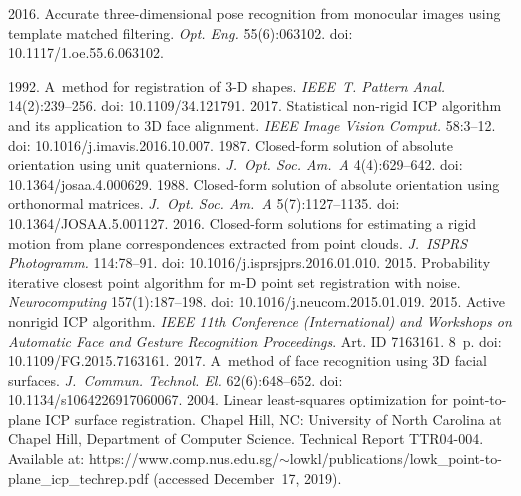 \begin{multicols}{2}
{{\begin{thebibliography}{99}
 2016. Accurate three-dimensional pose recognition from 
monocular images using template matched filtering. \textit{Opt. 
Eng.} 55(6):063102. doi: 10.1117/1.oe.55.6.063102.


 1992. A~method for registration of 3-D shapes. 
\textit{IEEE~T. Pattern Anal.} 14(2):239--256. 
doi: 10.1109/34.121791.
 2017. Statistical 
non-rigid ICP algorithm and its application to 3D face alignment. \textit{IEEE 
Image Vision Comput.} 58:3--12. doi: 10.1016/j.imavis.2016.10.007.
 1987. Closed-form solution of absolute orientation using unit 
quaternions. \textit{J.~Opt. Soc. Am.~A} 4(4):629--642. doi: 
10.1364/josaa.4.000629.
 1988. Closed-form solution 
of absolute orientation using orthonormal matrices. \textit{J.~Opt. Soc. 
Am.~A} 5(7):1127--1135. doi: 10.1364/JOSAA.5.001127.
 2016. Closed-form solutions for estimating a rigid motion 
from plane correspondences extracted from point clouds. \textit{J.~ISPRS 
Photogramm.} 114:78--91. doi: 
10.1016/j.isprsjprs.2016.01.010.
 2015. Probability iterative 
closest point algorithm for m-D point set registration with noise. 
\textit{Neurocomputing} 157(1):187--198. doi: 10.1016/j.neucom.2015.01.019.
 2015. Active nonrigid ICP 
algorithm. \textit{IEEE 11th  Conference (International) and Workshops on 
Automatic Face and Gesture Recognition Proceedings}. Art. ID 7163161. 8~p.
doi: 10.1109/FG.2015.7163161.
2017. A~method of face recognition using 3D facial surfaces. 
\textit{J.~Commun. Technol. El.} 62(6):648--652. doi: 
10.1134/s1064226917060067.
 2004. Linear least-squares optimization for point-to-plane ICP 
surface registration.  Chapel Hill, NC: University of 
North Carolina at Chapel Hill, Department of Computer Science. 
Technical Report TTR04-004. Available at: 
{\sf  
https://www.comp.nus.edu.sg/$\sim$lowkl/\linebreak publications/lowk\_point-to-plane\_icp\_techrep.pdf} (accessed December~17, 2019).
\end{thebibliography}}}
\end{multicols}
